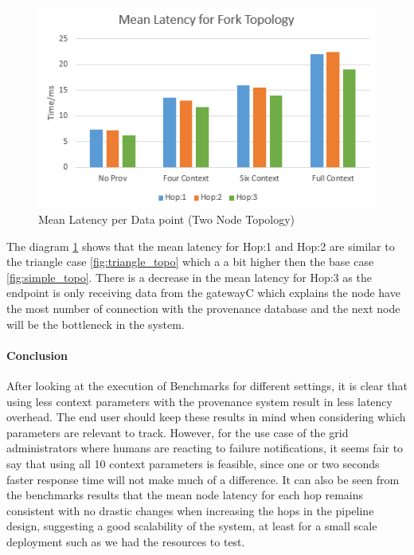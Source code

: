 \begin{figure}[H]
	\center
	\includegraphics[width=\textwidth]{figures/ForkTopology_latency.PNG}
	\caption{Mean Latency per Data point  (Two Node Topology)}
	\label{fig:forktopo_latency}
\end{figure}

The diagram \ref{fig:forktopo_latency} shows that the mean latency for Hop:1 and Hop:2 are similar to the triangle case \ref{fig:triangle_topo} which a a bit higher then the base case \ref{fig:simple_topo}. There is a decrease in the mean latency for Hop:3 as the endpoint is only receiving data from the gatewayC which explains the node have the most number of connection with the provenance database and the next node will be the bottleneck in the system. 

\paragraph*{Conclusion}
After looking at the execution of Benchmarks for different settings, it is clear that using less context parameters with the provenance system result in less latency overhead. 
The end user should keep these results in mind when considering which parameters are relevant to track.
However, for the use case of the grid administrators where humans are reacting to failure notifications, it seems fair to say that using all 10 context parameters is feasible, since one or two seconds faster response time will not make much of a difference.
It can also be seen from the benchmarks results that the mean node latency for each hop remains consistent with no drastic changes when increasing the hops in the pipeline design, suggesting a good scalability of the system, at least for a small scale deployment such as we had the resources to test.


